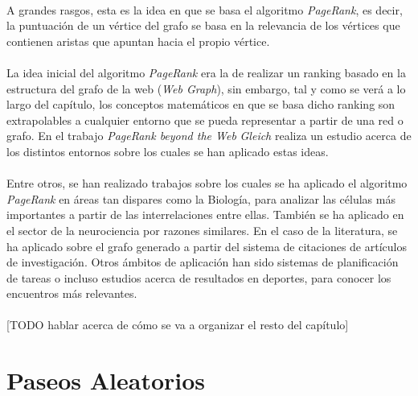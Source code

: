 \documentclass{subfiles}
\begin{document}
      \paragraph{}
      A grandes rasgos, esta es la idea en que se basa el algoritmo \emph{PageRank}, es decir, la puntuación de un vértice del grafo se basa en la relevancia de los vértices que contienen aristas que apuntan hacia el propio vértice.

      \paragraph{}
      La idea inicial del algoritmo \emph{PageRank} era la de realizar un ranking basado en la estructura del grafo de la web (\emph{Web Graph}), sin embargo, tal y como se verá a lo largo del capítulo, los conceptos matemáticos en que se basa dicho ranking son extrapolables a cualquier entorno que se pueda representar a partir de una red o grafo. En el trabajo \emph{PageRank beyond the Web}\cite{gleich2015pagerank} \emph{Gleich} realiza un estudio acerca de los distintos entornos sobre los cuales se han aplicado estas ideas.

      \paragraph{}
      Entre otros, se han realizado trabajos sobre los cuales se ha aplicado el algoritmo \emph{PageRank} en áreas tan dispares como la Biología, para analizar las células más importantes a partir de las interrelaciones entre ellas. También se ha aplicado en el sector de la neurociencia por razones similares. En el caso de la literatura, se ha aplicado sobre el grafo generado a partir del sistema de citaciones de artículos de investigación. Otros ámbitos de aplicación han sido sistemas de planificación de tareas o incluso estudios acerca de resultados en deportes, para conocer los encuentros más relevantes.


      \paragraph{}
      [TODO hablar acerca de cómo se va a organizar el resto del capítulo]


    \section{Paseos Aleatorios}
    \label{sec:random_walks}
\end{document}

